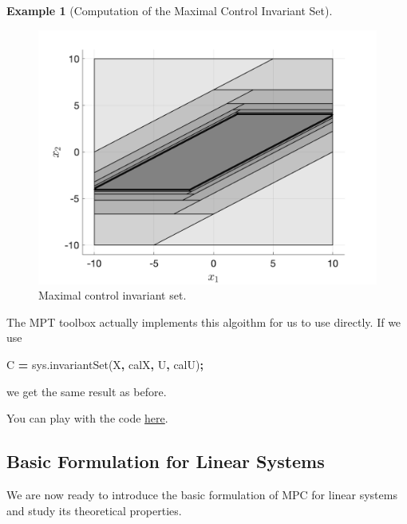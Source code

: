 \documentclass[
]{book}
\newenvironment{Shaded}{\begin{snugshade}}{\end{snugshade}}
\newcommand{\NormalTok}[1]{#1}
\newcommand{\OperatorTok}[1]{\textcolor[rgb]{0.81,0.36,0.00}{\textbf{#1}}}
\newcommand{\SpecialStringTok}[1]{\textcolor[rgb]{0.31,0.60,0.02}{#1}}
\newcommand{\VariableTok}[1]{\textcolor[rgb]{0.00,0.00,0.00}{#1}}
\theoremstyle{definition}
\theoremstyle{definition}
\newtheorem{example}{Example}[chapter]
\theoremstyle{definition}
\theoremstyle{definition}
\theoremstyle{remark}
\begin{document}
\begin{example}[Computation of the Maximal Control Invariant Set]
\begin{figure}

{\centering \includegraphics[width=0.6\linewidth]{images/maximal_control_invariant_set} 

}

\caption{Maximal control invariant set.}\label{fig:max-control-invariant-set}
\end{figure}

The MPT toolbox actually implements this algoithm for us to use directly. If we use

\begin{Shaded}
\begin{Highlighting}[]
\VariableTok{C} \OperatorTok{=} \VariableTok{sys}\NormalTok{.}\VariableTok{invariantSet}\NormalTok{(}\SpecialStringTok{\textquotesingle{}X\textquotesingle{}}\OperatorTok{,} \VariableTok{calX}\OperatorTok{,} \SpecialStringTok{\textquotesingle{}U\textquotesingle{}}\OperatorTok{,} \VariableTok{calU}\NormalTok{)}\OperatorTok{;}
\end{Highlighting}
\end{Shaded}

we get the same result as before.

You can play with the code \href{https://github.com/ComputationalRobotics/OptimalControlEstimation-Examples/blob/main/mpt_examples/maximal_control_invariant_set.m}{here}.
\end{example}

\hypertarget{basic-formulation-for-linear-systems}{%
\subsection{Basic Formulation for Linear Systems}\label{basic-formulation-for-linear-systems}}

We are now ready to introduce the basic formulation of MPC for linear systems and study its theoretical properties.
\end{document}
